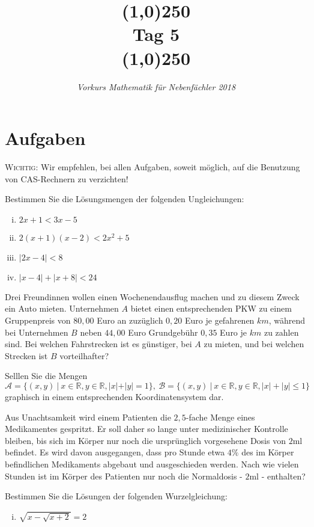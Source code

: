 \documentclass[11pt]{article}
\begin{document}
\title{\line(1,0){250}\\Tag 5\\\line(1,0){250}}
\date{}
\author{\itshape Vorkurs Mathematik für Nebenfächler 2018}
\maketitle

\section*{Aufgaben}
\textsc{Wichtig:} Wir empfehlen, bei allen Aufgaben, soweit möglich, auf die Benutzung von CAS-Rechnern zu verzichten!
\begin{task}
	Bestimmen Sie die L\"osungsmengen der folgenden Ungleichungen: 
	\begin{enumerate}[i)]
		\item $2x+1<3x-5$
		\item $2(x+1)(x-2)<2x^2+5$
		\item $|2x-4|<8$
		\item $|x-4|+|x+8|<24$
	\end{enumerate}
\end{task}
\begin{task}
	Drei Freundinnen wollen einen Wochenendausflug machen und zu diesem Zweck ein Auto mieten.
	Unternehmen $A$ bietet einen entsprechenden PKW zu einem Gruppenpreis von $80,00$ Euro an zuz\"uglich $0,20$ Euro je gefahrenen $km$, w\"ahrend bei Unternehmen $B$ neben
	$44,00$ Euro Grundgeb\"uhr $0,35$ Euro je $km$ zu zahlen sind. Bei welchen Fahrstrecken ist es g\"unstiger, bei $A$ zu mieten, und bei welchen Strecken ist $B$ vorteilhafter?
\end{task}
\dotfill
\begin{task}
	Selllen Sie die Mengen
	\[
	\mathcal{A}=\{(x,y)~|~x\in \mathbb{R},y\in \mathbb{R},|x|+|y| = 1\},~\mathcal{B} = \{(x,y)~|~x\in \mathbb{R},y\in \mathbb{R},|x|+|y|\leq 1\}
	\]
	graphisch in einem entsprechenden Koordinatensystem dar.
\end{task}
\dotfill
\begin{task}
Aus Unachtsamkeit wird einem Patienten die $2,5$-fache Menge eines Medikamentes gespritzt. Er soll daher so lange unter medizinischer Kontrolle bleiben, bis sich im K\"orper nur noch die urspr\"unglich vorgesehene Dosis von $2$ml befindet. Es wird davon ausgegangen, dass pro Stunde etwa $4\%$ des im K\"orper befindlichen Medikaments abgebaut und ausgeschieden werden. Nach wie vielen Stunden ist im K\"orper des Patienten nur noch die Normaldosis - $2$ml - enthalten?
\end{task}
\begin{task}
	Bestimmen Sie die L\"osungen der folgenden Wurzelgleichung:
	\begin{enumerate}[i)]
		\item $\sqrt{x-\sqrt{x+2}}=2$
	\end{enumerate}  
\end{task}

\end{document}
